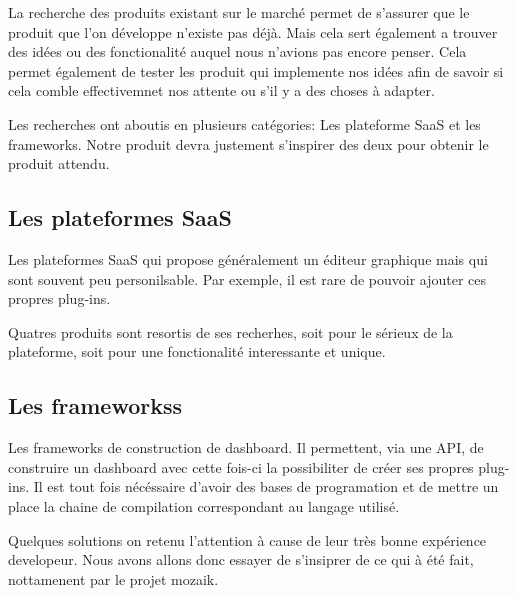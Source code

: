 La recherche des produits existant sur le marché permet de s'assurer que le produit que l'on développe n'existe pas déjà. Mais cela sert également a trouver des idées ou des fonctionalité auquel nous n'avions pas encore penser. Cela permet également de tester les produit qui implemente nos idées afin de savoir si cela comble effectivemnet nos attente ou s'il y a des choses à adapter.

Les recherches ont aboutis en plusieurs catégories: Les plateforme \gls{SaaS} et les \glspl{framework}. Notre produit devra justement s'inspirer des deux pour obtenir le produit attendu.


\subsection{Les plateformes \gls{SaaS}}

  Les plateformes \gls{SaaS} qui propose généralement un éditeur graphique mais qui sont souvent peu personilsable. Par exemple, il est rare de pouvoir ajouter ces propres plug-ins.

  Quatres produits sont resortis de ses recherhes, soit pour le sérieux de la plateforme, soit pour une fonctionalité interessante et unique.

\subsection{Les \glspl{frameworks} }

  Les \glspl{framework} de construction de dashboard. Il permettent, via une \gls{API}, de construire un dashboard avec cette fois-ci la possibiliter de créer ses propres plug-ins. Il est tout fois nécéssaire d'avoir des bases de programation et de mettre un place la chaine de compilation correspondant au langage utilisé.

  Quelques solutions on retenu l'attention à cause de leur très bonne expérience developeur. Nous avons allons donc essayer de s'insiprer de ce qui à été fait, nottamenent par le projet mozaik.